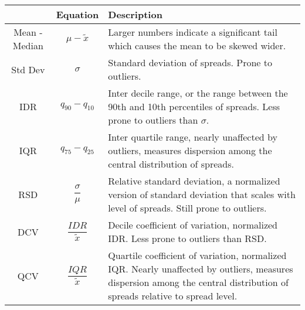 \documentclass[12pt]{article}
\begin{document}
\begin{table}[H]
	\caption{}
	\centering
	\begin{tabu} to 
		\toprule
		{} &      Equation  &        Description \\
		\midrule
		Mean - Median      &  $\mu - \tilde{x}$ &  Larger numbers indicate a significant tail which causes the mean to be skewed wider. \\
			\midrule
		Std Dev        &  $\sigma$ & Standard deviation of spreads. Prone to outliers. \\
			\midrule
		IDR       &  $q_{90} - q_{10}$ & Inter decile range, or the range between the 90th and 10th percentiles of spreads. Less
		prone to outliers than $\sigma$. \\
			\midrule
		IQR       &  $q_{75} - q_{25}$ & Inter quartile range, nearly unaffected by outliers, measures dispersion among the central
		distribution of spreads.\\
			\midrule
		RSD      & $\dfrac{\sigma}{\mu}$ & Relative standard deviation, a normalized version of standard deviation that scales
		with level of spreads. Still prone to outliers.   \\
			\midrule
		DCV      & $\dfrac{IDR}{\tilde{x}}$ & Decile coefficient of variation, normalized IDR. Less prone to outliers than RSD.   \\
			\midrule
		QCV      & $\dfrac{IQR}{\tilde{x}}$ & Quartile coefficient of variation, normalized IQR. Nearly unaffected by outliers, 
		measures dispersion among the central distribution of spreads relative to spread level.   \\
		\bottomrule
	\end{tabu}
\end{table}
\end{document}
